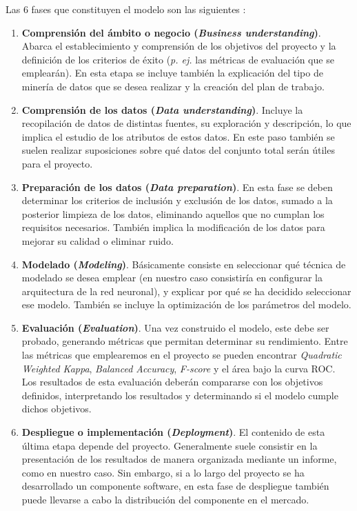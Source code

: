 Las 6 fases que constituyen el modelo son las siguientes \cite{crispdm:niaksu,crispdm:schorer}:
\begin{enumerate}[itemsep=0.1em]
    \item \textbf{Comprensión del ámbito o negocio (\textit{Business understanding})}. Abarca el establecimiento y comprensión de los objetivos del proyecto y la definición de los criterios de éxito (\textit{p. ej.} las métricas de evaluación que se emplearán). En esta etapa se incluye también la explicación del tipo de minería de datos que se desea realizar y la creación del plan de trabajo.
    \item \textbf{Comprensión de los datos (\textit{Data understanding})}. Incluye la recopilación de datos de distintas fuentes, su exploración y descripción, lo que implica el estudio de los atributos de estos datos. En este paso también se suelen realizar suposiciones sobre qué datos del conjunto total serán útiles para el proyecto.
    \item \textbf{Preparación de los datos (\textit{Data preparation})}. En esta fase se deben determinar los criterios de inclusión y exclusión de los datos, sumado a la posterior limpieza de los datos, eliminando aquellos que no cumplan los requisitos necesarios. También implica la modificación de los datos para mejorar su calidad o eliminar ruido.
    \item \textbf{Modelado (\textit{Modeling})}. Básicamente consiste en seleccionar qué técnica de modelado se desea emplear (en nuestro caso consistiría en configurar la arquitectura de la red neuronal), y explicar por qué se ha decidido seleccionar ese modelo. También se incluye la optimización de los parámetros del modelo.
    \item \textbf{Evaluación (\textit{Evaluation})}. Una vez construido el modelo, este debe ser probado, generando métricas que permitan determinar su rendimiento. Entre las métricas que emplearemos en el proyecto se pueden encontrar \textit{Quadratic Weighted Kappa}, \textit{Balanced Accuracy}, \textit{F-score} y el área bajo la curva ROC. Los resultados de esta evaluación deberán compararse con los objetivos definidos, interpretando los resultados y determinando si el modelo cumple dichos objetivos.
    \item \textbf{Despliegue o implementación (\textit{Deployment})}. El contenido de esta última etapa depende del proyecto. Generalmente suele consistir en la presentación de los resultados de manera organizada mediante un informe, como en nuestro caso. Sin embargo, si a lo largo del proyecto se ha desarrollado un componente software, en esta fase de despliegue también puede llevarse a cabo la distribución del componente en el mercado.
\end{enumerate}

